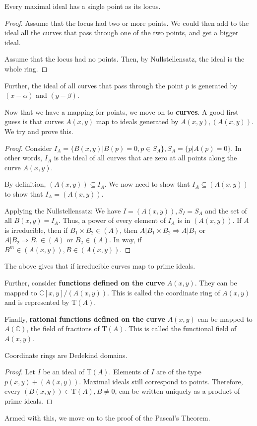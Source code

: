 \begin{lemma} \label{lem:maximalpoint}
  Every maximal ideal has a single point as its locus.
\end{lemma}
\begin{proof} \label{proof:maximalpoint}
  Assume that the locus had two or more points.
  We could then add to the ideal all the curves that pass through one of the two points, and get a bigger ideal.
  \par
  Assume that the locus had no points.
  Then, by Nullstellensatz, the ideal is the whole ring.
\end{proof}
Further, the ideal of all curves that pass through the point $p$ is generated by $(x - \alpha)$ and $(y - \beta)$.
\par
Now that we have a mapping for points, we move on to \textbf{curves}.
A good first guess is that curves $A(x, y)$ map to ideals generated by $A(x, y), (A(x, y))$.
We try and prove this.
\begin{proof} \label{proof:curveideal}
  Consider $I_{A} = \{ B(x, y) | B(p) = 0, p \in S_{A} \}, S_{A} = \{ p | A(p) = 0 \}$.
  In other words, $I_{A}$ is the ideal of all curves that are zero at all points along the curve $A(x, y)$.
  \par
  By definition, $(A(x, y)) \subseteq I_{A}$.
  We now need to show that $I_{A} \subseteq (A(x, y))$ to show that $I_{A} = (A(x, y))$.
  \par
  Applying the Nullstellensatz: We have $I = (A(x, y)), S_{I} = S_{A}$ and the set of all $B(x, y) = I_{A}$.
  Thus, a power of every element of $I_{A}$ is in $(A(x, y))$.
  If $A$ is irreducible, then if $B_{1} \times B_{2} \in (A)$, then $A | B_{1} \times B_{2} \Rightarrow A | B_{1}$ or $A | B_{2} \Rightarrow B_{1} \in (A)$ or $B_{2} \in (A)$.
  In way, if $B^{m} \in (A(x, y)), B \in (A(x, y))$.
\end{proof}
The above gives that if irreducible curves map to prime ideals.
\par
Further, consider \textbf{functions defined on the curve} $A(x, y)$.
They can be mapped to $\mathbb{C}[x, y] \big/ (A(x, y))$.
This is called the coordinate ring of $A(x, y)$ and is represented by $\mathrm{T} (A)$.
\par
Finally, \textbf{rational functions defined on the curve} $A(x, y)$ can be mapped to $A(\mathbb{C})$, the field of fractions of $\mathrm{T} (A)$.
This is called the functional field of $A(x, y)$.
\begin{theorem} \label{theorem:coordinateringdd}
  Coordinate rings are Dedekind domains.
\end{theorem}
\begin{proof} \label{proof:coordinateringdd}
  Let $I$ be an ideal of $\mathrm{T} (A)$.
  Elements of $I$ are of the type $p(x, y) + (A(x, y))$.
  Maximal ideals still correspond to points.
  Therefore, every $(B(x, y)) \in \mathrm{T} (A), B \neq 0$, can be written uniquely as a product of prime ideals.
\end{proof}
Armed with this, we move on to the proof of the Pascal's Theorem.
